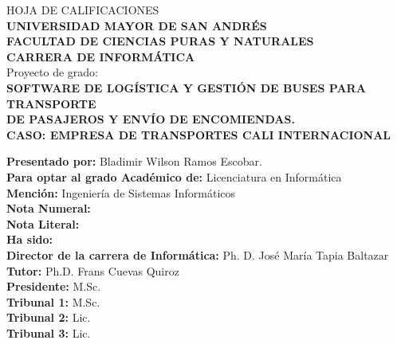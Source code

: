 \newpage
\thispagestyle{plain}
\begin{center}
	HOJA DE CALIFICACIONES\\
	\textbf{UNIVERSIDAD MAYOR DE SAN ANDRÉS}\\
	\textbf{FACULTAD DE CIENCIAS PURAS Y NATURALES}\\
	\textbf{CARRERA DE INFORMÁTICA}\\
	
	Proyecto de grado:\\
	\textbf{SOFTWARE DE LOGÍSTICA Y GESTIÓN DE BUSES PARA TRANSPORTE}\\
	\textbf{DE PASAJEROS Y ENVÍO DE ENCOMIENDAS.}\\
	\textbf{CASO: EMPRESA DE TRANSPORTES CALI INTERNACIONAL}\\[0.3cm]
	
	\begin{flushleft}
		\textbf{Presentado por:} Bladimir Wilson Ramos Escobar.\\[0.5cm]
		\textbf{Para optar al grado Académico de:} Licenciatura en Informática\\
		\textbf{Mención:} Ingeniería de Sistemas Informáticos\\[1cm]
	
	
		\textbf{Nota Numeral:} \dotfill\\
		\textbf{Nota Literal:} \dotfill\\
		\textbf{Ha sido:} \dotfill\\
		
		\textbf{Director de la carrera de Informática:} Ph. D. José María Tapia Baltazar\\
		\textbf{Tutor:} Ph.D. Frans Cuevas Quiroz\\[0.5cm]
		\textbf{Presidente:} M.Sc. \\
		\textbf{Tribunal 1:} M.Sc. \\
		\textbf{Tribunal 2:} Lic. \\
		\textbf{Tribunal 3:} Lic. \\
	\end{flushleft}
\end{center}

